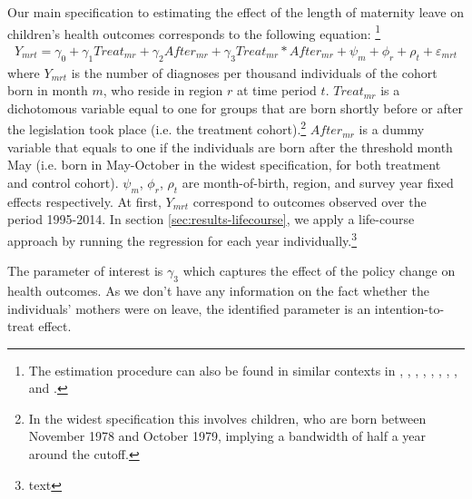 \documentclass[11pt, a4paper]{article} %
\begin{document}
Our main specification to estimating the effect of the length of maternity leave on children's health outcomes corresponds to the following equation: \footnote{The estimation procedure can also be found in similar contexts in \cite{RafaelLaliveandJosefZweimuller2009}, \cite{Dustmann2012}, \cite{Ekberg2013}, \cite{schonberg2014expansions}, \cite{Lalive2014}, \cite{Huebener2017}, \cite{danzer2017}, \cite{guertzgen2018}, and \cite{avdic2018modern}.}
\begin{align}
Y_{mrt} = \gamma_0 + \gamma_1 Treat_{mr} + \gamma_2 After_{mr} + \gamma_3 Treat_{mr} * After_{mr} + \psi_m + \phi_r + \rho_t + \varepsilon_{mrt}
\end{align}
where $Y_{mrt}$ is the number of diagnoses per thousand individuals of the cohort born in month $m$, who reside in region $r$ at time period $t$. $Treat_{mr}$ is a dichotomous variable equal to one for groups that are born shortly before or after the legislation took place (i.e. the treatment cohort).\footnote{In the widest specification this involves children, who are born between November 1978 and October 1979, implying a bandwidth of half a year around the cutoff.} $After_{mr}$ is a dummy variable that equals to one if the individuals are born after the threshold month May (i.e. born in May-October in the widest specification, for both treatment and control cohort). $\psi_m$, $\phi_r$, $\rho_t$ are month-of-birth, region, and survey year fixed effects respectively. At first, $Y_{mrt}$ correspond to outcomes observed over the period 1995-2014. In section \ref{sec:results-lifecourse}, we apply a life-course approach by running the regression for each year individually.\footnote{text} 


The parameter of interest is $\gamma_3$ which captures the effect of the policy change on health outcomes. As we don't have any information on the fact whether the individuals' mothers were on leave, the identified parameter is an intention-to-treat effect. \newline
\end{document}
